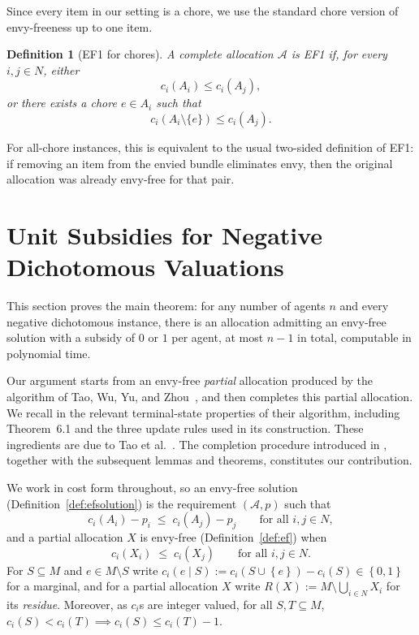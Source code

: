 \documentclass[sigconf,anonymous]{aamas}
\newcommand{\agents}{N}
\newcommand{\items}{M}
\newcommand{\alloc}{\mathcal{A}}
\newcommand{\bundle}[1]{A_{#1}}
\newcommand{\subsidy}{p}
\newcommand{\cost}{c}
\newcommand{\set}[1]{\left\{#1\right\}}
\theoremstyle{acmplain}
\theoremstyle{acmdefinition}
\newtheorem{definition}[theorem]{Definition}
\theoremstyle{acmplain}
\begin{document}
Since every item in our setting is a chore, we use the standard
chore version of envy-freeness up to one item.

\begin{definition}[EF1 for chores]
\label{def:ef1}
\label{def:ef1chores}
A complete allocation $\alloc$ is \emph{EF1} if, for every
$i,j\in\agents$, either
\[
\cost_i(\bundle{i})\le \cost_i(\bundle{j}),
\]
or there exists a chore $e\in\bundle{i}$ such that
\[
\cost_i(\bundle{i}\setminus\{e\})
\le
\cost_i(\bundle{j}).
\]
\end{definition}

For all-chore instances, this is equivalent to the usual two-sided
definition of EF1: if removing an item from the envied bundle
eliminates envy, then the original allocation was already envy-free
for that pair.
\section{Unit Subsidies for Negative Dichotomous Valuations}
\label{sec:main}

This section proves the main theorem: for any number of agents $n$ and every negative dichotomous instance, there is an allocation admitting an envy-free solution with a subsidy of $0$ or $1$ per agent, at most $n-1$ in total, computable in polynomial time. 


Our argument starts from an envy-free \emph{partial} allocation produced by the algorithm of Tao, Wu, Yu, and Zhou~\cite{tao2025existence}, and then completes this partial allocation. We recall in  the relevant terminal-state properties of their algorithm, including Theorem~6.1 and the three update rules used in its construction. These ingredients are due to Tao et al.~\cite{tao2025existence}. The completion procedure introduced in , together with the subsequent lemmas and theorems, constitutes our contribution.


We work in cost form throughout, so an envy-free solution (Definition~\ref{def:efsolution}) is the requirement $(\mathcal{A},p)$ such that
\begin{equation} \label{eq:m-ef}
  \cost_i(\bundle i) - \subsidy_i \;\le\; \cost_i(\bundle j) - \subsidy_j  \qquad \text{for all } i,j \in \agents ,
\end{equation} 
and a partial allocation $X$ is envy-free (Definition~\ref{def:ef}) when
\begin{equation} \label{eq:m-pef}
  \cost_i(X_i) \;\le\; \cost_i(X_j)
  \qquad \text{for all } i,j \in \agents .
\end{equation}
For $S \subseteq \items$ and $e \in \items \setminus S$ write $\cost_i(e \mid S) := \cost_i(S \cup \set e) - \cost_i(S) \in \set{0,1}$ for a marginal, and for a partial allocation $X$ write $R(X) := \items \setminus \bigcup_{i \in \agents} X_i$ for its \emph{residue}.  Moreover, as $\cost_i$s are integer valued, for all $S,T\subseteq M$, \(\cost_i(S) < \cost_i(T) \implies \cost_i(S) \le \cost_i(T) - 1 .
 \)
\end{document}
